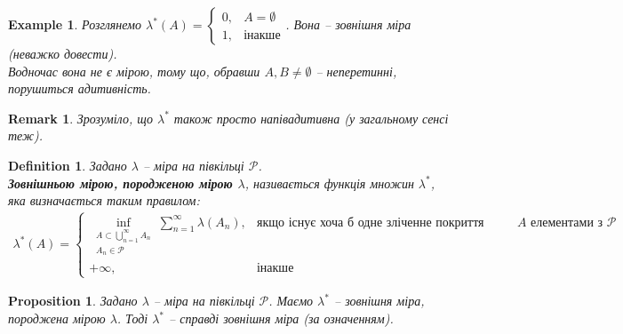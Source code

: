 \documentclass[a4paper, 10pt]{article}
\theoremstyle{theoremdd}
\newtheorem{definition}[theorem]{Definition}
\newtheorem{example}[theorem]{Example}
\newtheorem{proposition}[theorem]{Proposition}
\newtheorem{remark}[theorem]{Remark}
\begin{document}
\begin{example}
Розглянемо $\lambda^*(A) = \begin{cases} 0, & A = \emptyset \\ 1, & \text{інакше} \end{cases}$. Вона -- зовнішня міра (неважко довести).\\
Водночас вона не є мірою, тому що, обравши $A,B \neq \emptyset$ -- неперетинні, порушиться адитивність.
\end{example}

\begin{remark}
Зрозуміло, що $\lambda^*$ також просто напівадитивна (у загальному сенсі теж).
\end{remark}

\begin{definition}
Задано $\lambda$ -- міра на півкільці $\mathcal{P}$.\\
\textbf{Зовнішньою мірою, породженою мірою $\lambda$}, називається функція множин $\lambda^*$, яка визначається таким правилом:
\begin{align*}
\lambda^*(A) = \begin{cases} \displaystyle\inf_{\substack{A \subset \bigcup_{n=1}^\infty A_n \\ A_n \in \mathcal{P}}} \sum_{n=1}^\infty \lambda(A_n), & \text{якщо існує хоча б одне зліченне покриття множини $A$ елементами з $\mathcal{P}$} \\
+\infty, & \text{інакше} \end{cases}
\end{align*}
\end{definition}

\begin{proposition}
Задано $\lambda$ -- міра на півкільці $\mathcal{P}$. Маємо $\lambda^*$ -- зовнішня міра, породжена мірою $\lambda$. Тоді $\lambda^*$ -- справді зовнішня міра (за означенням).
\end{proposition}
\end{document}
